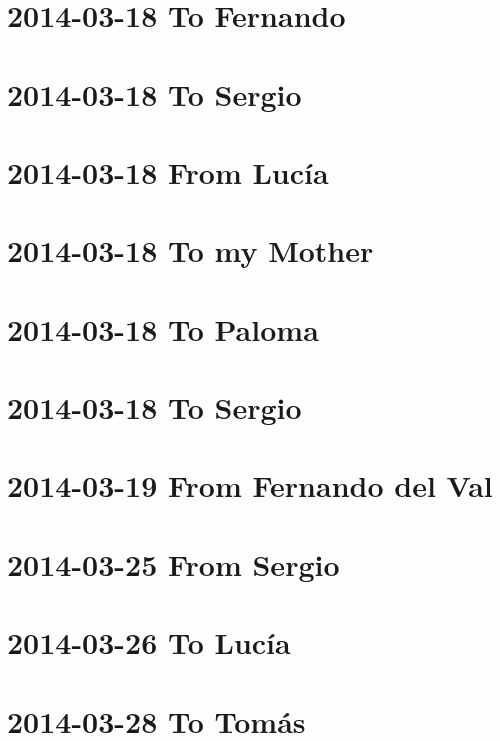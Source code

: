 \documentclass[]{book}
\begin{document}
\hypertarget{to-fernando}{%
\section{2014-03-18 To Fernando}\label{to-fernando}}

\hypertarget{to-sergio}{%
\section{2014-03-18 To Sergio}\label{to-sergio}}

\hypertarget{from-lucia-1}{%
\section{2014-03-18 From Lucía}\label{from-lucia-1}}

\hypertarget{to-my-mother-2}{%
\section{2014-03-18 To my Mother}\label{to-my-mother-2}}

\hypertarget{to-paloma-1}{%
\section{2014-03-18 To Paloma}\label{to-paloma-1}}

\hypertarget{to-sergio-1}{%
\section{2014-03-18 To Sergio}\label{to-sergio-1}}

\hypertarget{from-fernando-del-val-1}{%
\section{2014-03-19 From Fernando del Val}\label{from-fernando-del-val-1}}

\hypertarget{from-sergio}{%
\section{2014-03-25 From Sergio}\label{from-sergio}}

\hypertarget{to-lucia-3}{%
\section{2014-03-26 To Lucía}\label{to-lucia-3}}

\hypertarget{to-tomas-5}{%
\section{2014-03-28 To Tomás}\label{to-tomas-5}}
\end{document}
